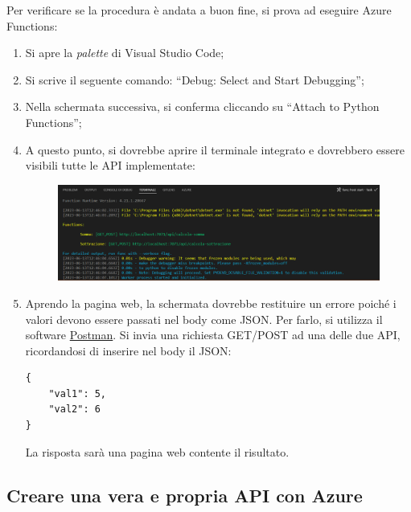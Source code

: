 \documentclass[a4paper]{article}
\newcommand{\dquotes}[1]{``#1''}
\begin{document}
	Per verificare se la procedura è andata a buon fine, si prova ad eseguire Azure Functions:
	\begin{enumerate}
		\item Si apre la \emph{palette} di Visual Studio Code;
		
		\item Si scrive il seguente comando: \dquotes{\textsf{Debug: Select and Start Debugging}};
		
		\item Nella schermata successiva, si conferma cliccando su \dquotes{\textsf{Attach to Python Functions}};
		
		\item A questo punto, si dovrebbe aprire il terminale integrato e dovrebbero essere visibili tutte le API implementate:
		\begin{figure}[!htp]
			\centering
			\includegraphics[width=\textwidth]{img/azure-4.png}
		\end{figure}
		
		\item Aprendo la pagina web, la schermata dovrebbe restituire un errore poiché i valori devono essere passati nel body come JSON. Per farlo, si utilizza il software \href{https://www.postman.com/}{Postman}. Si invia una richiesta GET/POST ad una delle due API, ricordandosi di inserire nel body il JSON:
		\begin{lstlisting}
{
	"val1": 5,
	"val2": 6
}\end{lstlisting}
		La risposta sarà una pagina web contente il risultato.
	\end{enumerate}\newpage
	
	\subsection{Creare una vera e propria API con Azure}
	
\end{document}

